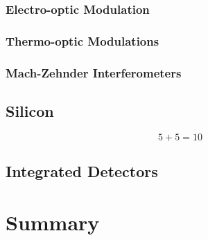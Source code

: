 \subsubsection*{Electro-optic Modulation}

\subsubsection*{Thermo-optic Modulations}

\subsubsection*{Mach-Zehnder Interferometers}

\subsection{Silicon}

\begin{equation}
	5+5=10
\end{equation}
	

\subsection{Integrated Detectors}

\section{Summary}


